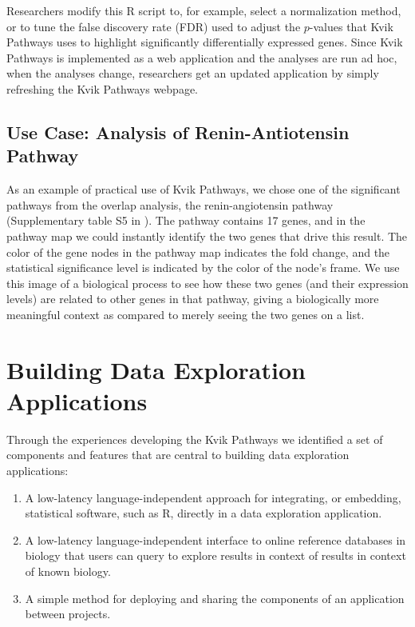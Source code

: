 Researchers modify this R script to, for example, select a normalization method,
or to tune the false discovery rate (FDR) used to adjust the $p$-values that
Kvik Pathways uses to highlight significantly differentially expressed genes.
Since Kvik Pathways is implemented as a web application and the analyses are run
ad hoc, when the analyses change, researchers get an updated application by
simply refreshing the Kvik Pathways webpage.

\subsection{Use Case: Analysis of Renin-Antiotensin Pathway}
As an example of practical use of Kvik Pathways, we chose one of the
significant pathways from the overlap analysis, the renin-angiotensin
pathway (Supplementary table S5 in \cite{olsen2013plasma}). The pathway
contains 17 genes, and in the pathway map we could instantly identify the
two genes that drive this result. The color of the gene nodes in the pathway
map indicates the fold change, and the statistical significance level is
indicated by the color of the node's frame.  We use this image of a
biological process to see how these two genes (and their expression levels)
are related to other genes in that pathway, giving a biologically more
meaningful context as compared to merely seeing the two genes on a list.

\section{Building Data Exploration Applications}\label{challengeref} 
Through the experiences developing the Kvik Pathways we identified a set of
components and features that are central to building data exploration
applications: 

\begin{enumerate}
    \item A low-latency language-independent approach for integrating, or
        embedding, statistical software, such as R, directly in a data
        exploration application. 
    \item A low-latency language-independent interface to online reference
        databases in biology that users can query to explore results in context
        of results in context of known biology. 
    \item A simple method for deploying and sharing the components of an
        application between projects. 
\end{enumerate} 


